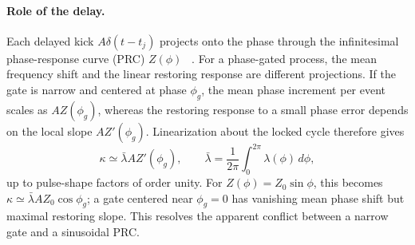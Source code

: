 \documentclass[aps,pre,reprint,amsmath,amssymb,floatfix,nofootinbib]{revtex4-2}
\begin{document}
\paragraph*{Role of the delay.}
Each delayed kick $A\delta(t-t_j)$ projects onto the phase through the
infinitesimal phase-response curve (PRC) $Z(\phi)$
~\cite{Kuramoto1984,Pikovsky2001}. For a phase-gated process, the mean
frequency shift and the linear restoring response are different
projections. If the gate is narrow and centered at phase $\phi_g$, the
mean phase increment per event scales as $A Z(\phi_g)$, whereas the
restoring response to a small phase error depends on the local slope
$A Z'(\phi_g)$. Linearization about the locked cycle therefore gives
\begin{equation}
  \kappa \simeq \bar\lambda A Z'(\phi_g),
  \qquad
  \bar\lambda = \frac{1}{2\pi}\int_0^{2\pi}\lambda(\phi)\,d\phi,
  \label{eq:kappa_gate}
\end{equation}
up to pulse-shape factors of order unity. For $Z(\phi)=Z_0\sin\phi$,
this becomes $\kappa\simeq \bar\lambda A Z_0\cos\phi_g$; a gate centered
near $\phi_g=0$ has vanishing mean phase shift but maximal restoring
slope. This resolves the apparent conflict between a narrow gate and a
sinusoidal PRC.
\end{document}
